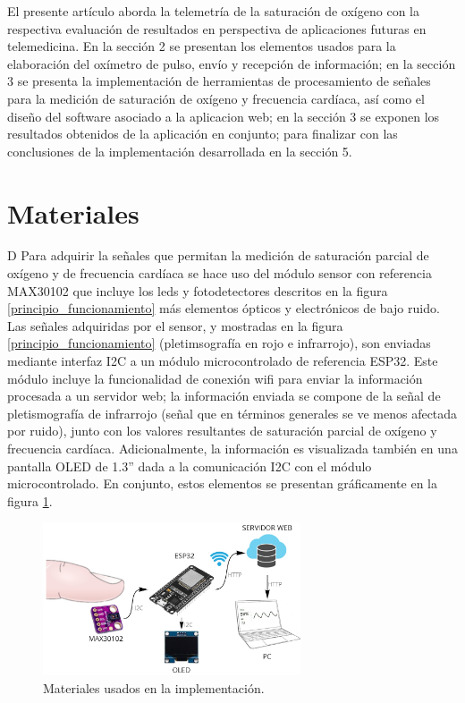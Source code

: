 \documentclass[journal]{IEEEtran}
\begin{document}
El presente artículo aborda la telemetría de la saturación de oxígeno con la respectiva evaluación de resultados en perspectiva de aplicaciones futuras en telemedicina. En la sección 2 se presentan los elementos usados para la elaboración del oxímetro de pulso, envío y recepción de información; en la sección 3 se presenta la implementación de herramientas de procesamiento de señales para la medición de saturación de oxígeno y frecuencia cardíaca, así como el diseño del software asociado a la aplicacion web; en la sección 3 se exponen los resultados obtenidos de la aplicación en conjunto; para finalizar con las conclusiones  de la implementación desarrollada en la sección 5.










\section{Materiales}

{\color{blue}D}
Para adquirir la señales que permitan la medición de saturación parcial de oxígeno y de frecuencia cardíaca se hace uso del módulo sensor con referencia MAX30102 que incluye los leds y fotodetectores descritos en la figura \ref{principio_funcionamiento} más elementos ópticos y electrónicos de bajo ruido. Las señales adquiridas por el sensor, y mostradas en la figura \ref{principio_funcionamiento} (pletimsografía en rojo e infrarrojo), son enviadas mediante interfaz I2C a un  módulo microcontrolado de referencia ESP32. Este módulo incluye la funcionalidad de conexión wifi para enviar la información procesada a un servidor web;  la información enviada se compone de  la señal de pletismografía de infrarrojo (señal que en términos generales se ve menos afectada por ruido), junto con los valores resultantes de saturación parcial de oxígeno y frecuencia cardíaca. Adicionalmente, la información es visualizada también en una pantalla OLED de 1.3'' dada a la comunicación I2C con el módulo microcontrolado. En conjunto, estos elementos se presentan gráficamente en la figura \ref{materiales}.
  


\begin{figure}[!h]
	\centering
	\includegraphics[width=3in]{Materiales.png}
	\caption{Materiales usados en la implementación.}
	\label{materiales}
\end{figure}
\end{document}
